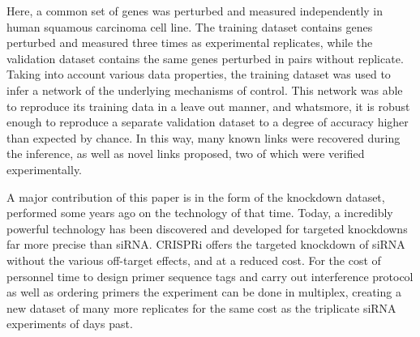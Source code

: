 
Here, a common set of genes was perturbed and measured independently in human squamous carcinoma cell line. The training dataset contains genes perturbed and measured three times as experimental replicates, while the validation dataset contains the same genes perturbed in pairs without replicate. Taking into account various data properties, the training dataset was used to infer a network of the underlying mechanisms of control. This network was able to reproduce its training data in a leave out manner, and whatsmore, it is robust enough to reproduce a separate validation dataset to a degree of accuracy higher than expected by chance. In this way, many known links were recovered during the inference, as well as novel links proposed, two of which were verified experimentally. 

A major contribution of this paper is in the form of the knockdown dataset, performed some years ago on the technology of that time. Today, a incredibly powerful technology has been discovered and developed for targeted knockdowns far more precise than siRNA. CRISPRi offers the targeted knockdown of siRNA without the various off-target effects, and at a reduced cost. For the cost of personnel time to design primer sequence tags and carry out interference protocol as well as ordering primers the experiment can be done in multiplex, creating a new dataset of many more replicates for the same cost as the triplicate siRNA experiments of days past.


